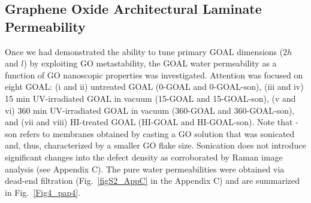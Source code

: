 \subsection{Graphene Oxide Architectural Laminate Permeability}
Once we had demonstrated the ability to tune primary GOAL dimensions ($2h$ and $l$) by exploiting GO metastability, the GOAL water permeability as a function of GO nanoscopic properties was investigated. Attention was focused on eight GOAL: (i and ii) untreated GOAL (0-GOAL and 0-GOAL-son), (iii and iv) 15 min UV-irradiated GOAL in vacuum (15-GOAL and 15-GOAL-son), (v and vi) 360 min UV-irradiated GOAL in vacuum (360-GOAL and 360-GOAL-son), and (vii and viii) HI-treated GOAL (HI-GOAL and HI-GOAL-son). Note that -son refers to membranes obtained by casting a GO solution that was sonicated and, thus, characterized by a smaller GO flake size. Sonication does not introduce significant changes into the defect density as corroborated by Raman image analysis (see Appendix C). The pure water permeabilities were obtained via dead-end filtration (Fig.~\ref{figS2_AppC} in the Appendix C) and are summarized in Fig.~\ref{Fig4_pap4}.

